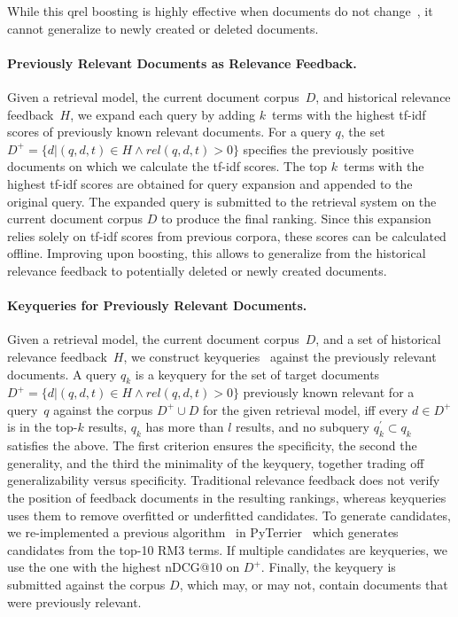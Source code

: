     
While this qrel boosting is highly effective when documents do not change~\cite{alkhalifa:2024,keller:2024b}, it cannot generalize to newly created or deleted documents.

\paragraph{Previously Relevant Documents as Relevance Feedback.} Given a retrieval model, the current document corpus~$D$, and historical relevance feedback~$H$, we expand each query by adding $k$~terms with the highest tf-idf scores of previously known relevant documents. For a query $q$, the set $D^{+} = \{d| (q,d,t) \in H \wedge rel(q,d,t) > 0\}$ specifies the previously positive documents on which we calculate the tf-idf scores. The top $k$~terms with the highest tf-idf scores are obtained for query expansion and appended to the original query. The expanded query is submitted to the retrieval system on the current document corpus $D$ to produce the final ranking. Since this expansion relies solely on tf-idf scores from previous corpora, these scores can be calculated offline. Improving upon boosting, this allows to generalize from the historical relevance feedback to potentially deleted or newly created documents.


\paragraph{Keyqueries for Previously Relevant Documents.} Given a retrieval model, the current document corpus~$D$, and a set of historical relevance feedback~$H$, we construct keyqueries~\cite{froebe:2021c,gollub:2013a,hagen:2016b} against the previously relevant documents. A query $q_{k}$ is a keyquery for the set of target documents $D^{+} = \{d| (q,d,t) \in H \wedge rel(q,d,t) > 0\}$ previously known relevant for a query~$q$ against the corpus $D^{+} \cup D$ for the given retrieval model, iff \Ni every $d \in D^{+}$ is in the top-$k$ results, \Nii $q_{k}$ has more than $l$ results, and \Niii no subquery $q^{'}_{k} \subset q_{k}$ satisfies the above. The first criterion ensures the specificity, the second the generality, and the third the minimality of the keyquery, together trading off generalizability versus specificity. Traditional relevance feedback does not verify the position of feedback documents in the resulting rankings, whereas keyqueries uses them to remove overfitted or underfitted candidates. To generate candidates, we re-implemented a previous algorithm~\cite{froebe:2022c} in PyTerrier~\cite{macdonald:2020} which generates candidates from the top-10 RM3 terms. If multiple candidates are keyqueries, we use the one with the highest nDCG@10 on $D^{+}$. Finally, the keyquery is submitted against the corpus $D$, which may, or may not, contain documents that were previously relevant.

